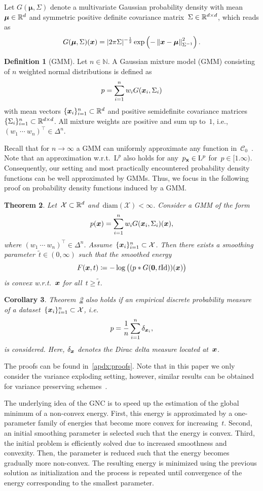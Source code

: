 \documentclass{article}
\newcommand{\N}{\mathbb{N}}
\newcommand{\C}{\mathcal{C}}
\renewcommand{\L}{\mathrm{L}}
\newcommand{\X}{\mathcal{X}}
\newcommand{\id}{\mathrm{Id}}
\newcommand{\norm}[1]{\left\Vert#1\right\Vert}
\renewcommand{\vec}[1]{\mathbf{#1}}
\newcommand{\diameter}{\mathrm{diam}}
\theoremstyle{plain}
\newtheorem{theorem}{Theorem}[section]
\newtheorem{corollary}[theorem]{Corollary}
\theoremstyle{definition}
\newtheorem{definition}[theorem]{Definition}
\theoremstyle{remark}
\begin{document}
Let $G(\bm{\mu},\Sigma)$ denote a multivariate Gaussian probability density with mean~$\bm{\mu}\in\mathbb{R}^d$ and symmetric positive definite covariance matrix~$\Sigma\in\mathbb{R}^{d\times d}$, which reads as
\[
G(\bm{\mu},\Sigma)(\vx)=\vert 2\pi\Sigma\vert^{-\frac{1}{2}}\exp\left(-\norm{\vx-\bm{\mu}}_{\Sigma^{-1}}^2\right).
\]
\begin{definition}[GMM]
Let $n\in\N$.
A Gaussian mixture model (GMM) consisting of $n$ weighted normal distributions is defined as
\[
p = \sum_{i=1}^n w_i G({\bm{x}}_i,\Sigma_i)
\]
with mean vectors $\{{\bm{x}}_i\}_{i=1}^n\subset\mathbb{R}^d$ and positive semidefinite covariance matrices~$\{\Sigma_i\}_{i=1}^n\subset\mathbb{R}^{d\times d}$.
All mixture weights are positive and sum up to~$1$, i.e., $(w_1\ \cdots\ w_n)^\top\in\Delta^n$.
\end{definition}
Recall that for $n\to\infty$ a GMM can uniformly approximate any function in~$\C_0$~\citep{NgNg20}.
Note that an approximation w.r.t.~$\L^p$ also holds for any~$p_\rvx\in\L^p$ for~$p\in[1.\infty)$.
Consequently, our setting and most practically encountered probability density functions can be well approximated by GMMs.
Thus, we focus in the following proof on probability density functions induced by a GMM.

\begin{theorem}\label{thm:Fconvex}
Let~$\X\subset\R^d$ and~$\diameter(\X)<\infty$. 
Consider a GMM of the form
\[
p({\bm{x}}) = \sum_{i=1}^n w_i G({\bm{x}}_i,\Sigma_i)({\bm{x}}),
\]
where $(w_1\ \cdots \ w_n)^\top\in\Delta^n$. Assume~$\{\vx_i\}_{i=1}^n\subset\X$.
Then there exists a smoothing parameter~$\widetilde{t}\in(0,\infty)$ such that the smoothed energy
\[
F(\vx,t)\coloneqq -\log \big( (p \ast G(\vec{0}, t\id))(\vx)\big)
\]
is \emph{convex} w.r.t.~${\bm{x}}$ for all~$t\geq\widetilde{t}$.
\end{theorem}
\begin{corollary}\label{cor:empirical}
Theorem~\ref{thm:Fconvex} also holds if an empirical discrete probability measure of a dataset~$\{\vx_i\}_{i=1}^n\subset\X$, i.e.
\[
p = \frac{1}{n}\sum_{i=1}^n\delta_{{\bm{x}}_i},
\]
is considered.
Here, $\delta_{{\bm{x}}}$ denotes the Dirac delta measure located at~${\bm{x}}$.
\end{corollary}
The proofs can be found in~\cref{apdx:proofs}.
Note that in this paper we only consider the variance exploding setting, however, similar results can be obtained for variance preserving schemes~\citep{SoSo20}. 

The underlying idea of the GNC is to speed up the estimation of the global minimum of a non-convex energy.
First, this energy is approximated by a one-parameter family of energies that become more convex for increasing~$t$.
Second, an initial smoothing parameter is selected such that the energy is convex.
Third, the initial problem is efficiently solved due to increased smoothness and convexity.
Then, the parameter is reduced such that the energy becomes gradually more non-convex.
The resulting energy is minimized using the previous solution as initialization and the process is repeated until convergence of the energy corresponding to the smallest parameter.
\end{document}
